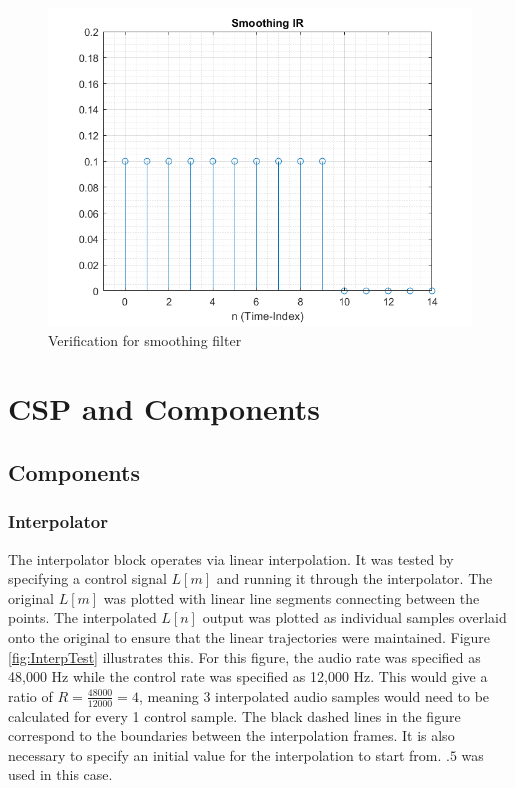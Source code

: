 \documentclass[../main.tex]{subfiles}
\begin{document}
\begin{figure}[h]
    \centering
    \includegraphics[scale=.65]{./images/plots/SmoothingIR.png}
    \caption{Verification for smoothing filter}
    \label{fig:SmoothingIR}
\end{figure}

\section{CSP and Components}
\subsection{Components}
\subsubsection{Interpolator}
The interpolator block operates via linear interpolation. It was tested by specifying a control signal $L[m]$ and running it through the interpolator. The original $L[m]$ was plotted with linear line segments connecting between the points. The interpolated $L[n]$ output was plotted as individual samples overlaid onto the original to ensure that the linear trajectories were maintained. Figure \ref{fig:InterpTest} illustrates this. For this figure, the audio rate was specified as 48,000 Hz while the control rate was specified as 12,000 Hz. This would give a ratio of $R = \frac{48000}{12000} = 4$, meaning 3 interpolated audio samples would need to be calculated for every 1 control sample. The black dashed lines in the figure correspond to the boundaries between the interpolation frames. It is also necessary to specify an initial value for the interpolation to start from. $.5$ was used in this case.
\end{document}
